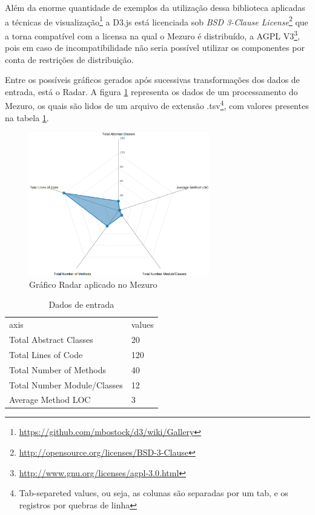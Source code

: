 Além da enorme quantidade de exemplos da utilização dessa biblioteca aplicadas a técnicas de visualização\footnote{\url{https://github.com/mbostock/d3/wiki/Gallery}} a D3.js está licenciada sob \textit{BSD 3-Clause License}\footnote{\url{http://opensource.org/licenses/BSD-3-Clause}} que a torna compatível com a licensa na qual o Mezuro é distribuído, a AGPL V3\footnote{\url{http://www.gnu.org/licenses/agpl-3.0.html}}, pois em caso de incompatibilidade não seria possível utilizar os componentes por conta de restrições de distribuição.

Entre os possíveis gráficos gerados após sucessivas transformações dos dados de entrada, está o Radar. A figura \ref{radar-chart-mezuro} representa os dados de um processamento do Mezuro, os quais são lidos de um arquivo de extensão .tsv\footnote{Tab-separeted values, ou seja, as colunas são separadas por um tab, e os registros por quebras de linha}, com valores presentes na tabela \ref{data-tsv}.

\graphicspath{{figuras/}}
\begin{figure}[h]
\centering
\includegraphics[width=0.7\textwidth]{radar_chart_mezuro}
\caption{Gráfico Radar aplicado no Mezuro}
\label{radar-chart-mezuro}
\end{figure}

\begin{table}[h]
\begin{center}
    \begin{tabular}{ll}
	axis & values \\
	Total Abstract Classes & 20 \\
	Total Lines of Code & 120 \\
	Total Number of Methods & 40 \\
	Total Number Module/Classes & 12 \\
	Average Method LOC & 3 \\
	\end{tabular}
    \caption{Dados de entrada}
    \label{data-tsv}
\end{center}
\end{table}

